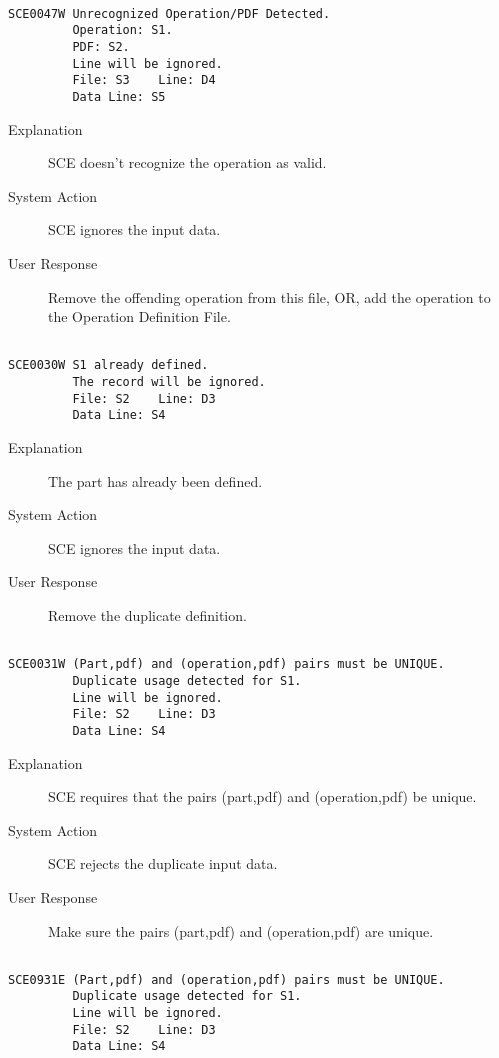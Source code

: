 \hrulefill
\begin{verbatim}

SCE0047W Unrecognized Operation/PDF Detected.
         Operation: S1.
         PDF: S2.
         Line will be ignored.
         File: S3    Line: D4
         Data Line: S5
\end{verbatim}
\begin{description}
\item[Explanation]  SCE doesn't recognize the operation as valid.

\item[System Action]  SCE ignores the input data.

\item[User Response]  Remove the offending operation from this file, OR, add the operation to the Operation Definition File.
\end{description}
\hrulefill
\begin{verbatim}

SCE0030W S1 already defined.
         The record will be ignored.
         File: S2    Line: D3
         Data Line: S4
\end{verbatim}
\begin{description}
\item[Explanation]  The part has already been defined.

\item[System Action]  SCE ignores the input data.

\item[User Response]  Remove the duplicate definition.
\end{description}
\hrulefill
\begin{verbatim}

SCE0031W (Part,pdf) and (operation,pdf) pairs must be UNIQUE.
         Duplicate usage detected for S1.
         Line will be ignored.
         File: S2    Line: D3
         Data Line: S4
\end{verbatim}
\begin{description}
\item[Explanation]  SCE requires that the pairs (part,pdf) and (operation,pdf)
 be unique.

\item[System Action]  SCE rejects the duplicate input data.

\item[User Response]  Make sure the pairs (part,pdf) and (operation,pdf) 
 are unique.
\end{description}
\hrulefill
\begin{verbatim}

SCE0931E (Part,pdf) and (operation,pdf) pairs must be UNIQUE.
         Duplicate usage detected for S1.
         Line will be ignored.
         File: S2    Line: D3
         Data Line: S4
\end{verbatim}
